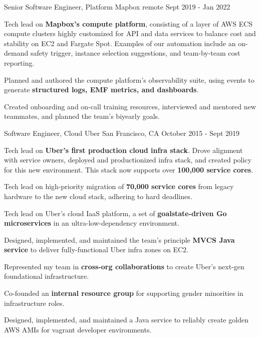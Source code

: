 
\begin{cventries}
  \cventry
    {Senior Software Engineer, Platform}
    {Mapbox}
    {remote}
    {Sept 2019 - Jan 2022}
    {
      \begin{cvitems}
        \item {Tech lead on \textbf{Mapbox's compute platform}, consisting of a layer of AWS ECS compute clusters highly customized for API and data services to balance cost and stability on EC2 and Fargate Spot. Examples of our automation include an on-demand safety trigger, instance selection suggestions, and team-by-team cost reporting.}
        \item {Planned and authored the compute platform's observability suite, using events to generate \textbf{structured logs, EMF metrics, and dashboards}.}
        \item {Created onboarding and on-call training resources, interviewed and mentored new teammates, and planned the team's biyearly goals.}
      \end{cvitems}
    }

  \cventry
    {Software Engineer, Cloud}
    {Uber}
    {San Francisco, CA}
    {October 2015 - Sept 2019}
    {
      \begin{cvitems} %
        \item {Tech lead on \textbf{Uber's first production cloud infra stack}. Drove alignment with service owners, deployed and productionized infra stack, and created policy for this new environment.  This stack now supports over \textbf{100,000 service cores}.}
        \item {Tech lead on high-priority migration of \textbf{70,000 service cores} from legacy hardware to the new cloud stack, adhering to hard deadlines.}
        \item {Tech lead on Uber's cloud IaaS platform, a set of \textbf{goalstate-driven Go microservices} in an ultra-low-dependency environment.}
        \item {Designed, implemented, and maintained the team's principle \textbf{MVCS Java service} to deliver fully-functional Uber infra zones on EC2.}
        \item {Represented my team in \textbf{cross-org collaborations} to create Uber's next-gen foundational infrastructure.}
        \item {Co-founded an \textbf{internal resource group} for supporting gender minorities in infrastructure roles.}
        \item {Designed, implemented, and maintained a Java service to reliably create golden AWS AMIs for vagrant developer environments.}
      \end{cvitems}
    }

\end{cventries}
